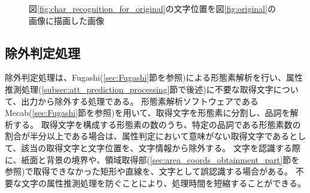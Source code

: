 \begin{figure}[t]
    \begin{center}
        \caption{図\ref{fig:char_recognition_for_original}の文字位置を図\ref{fig:original}の画像に描画した画像}
        \label{fig:bbox_recognition_for_original}
    \end{center}
\end{figure}

\subsection{除外判定処理}\label{subsec:exclusion_judgement_processing}
除外判定処理は、Fugashi(\ref{sec:Fugashi}節を参照)による形態素解析を行い、属性推測処理(\ref{subsec:att_prediction_processing}節で後述)に不要な取得文字について、出力から除外する処理である。
形態素解析ソフトウェアであるMecab(\ref{sec:Fugashi}節を参照)を用いて、取得文字を形態素に分割し、品詞を解析する。
取得文字を構成する形態素の数のうち、特定の品詞である形態素数の割合が半分以上である場合は、属性判定において意味がない取得文字であるとして、該当の取得文字と文字位置を、文字情報から除外する。
文字を認識する際に、紙面と背景の境界や、領域取得部(\ref{sec:area_coords_obtainment_part}節を参照)で取得できなかった矩形や直線を、文字として誤認識する場合がある。
不要な文字の属性推測処理を防ぐことにより、処理時間を短縮することができる。

